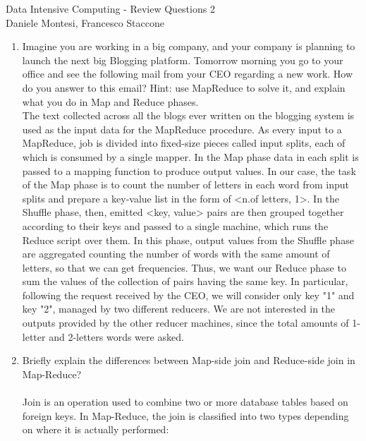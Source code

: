 \documentclass[]{report}
\begin{document}
\begin{center}
 {\Large Data Intensive Computing - Review Questions 2}\\
 \vspace{0.5cm}
 {\small Daniele Montesi, Francesco Staccone}
\end{center}
\vspace{0.5cm}
\justify
\begin{enumerate}
 \item Imagine you are working in a big company, and your company is planning to launch the next big Blogging
platform. Tomorrow morning you go to your office and see the following mail from your CEO regarding
a new work. How do you answer to this email? Hint: use MapReduce to solve it, and explain what you
do in Map and Reduce phases.\\

The text collected across all the blogs ever written on the blogging system is used as the input data for the MapReduce procedure. As every input to a MapReduce, job is divided into fixed-size pieces called input splits, each of which is consumed by a single mapper. In the Map phase data in each split is passed to a mapping function to produce output values. In our case, the task of the Map phase is to count the number of letters in each word from input splits and prepare a key-value list in the form of <n.of letters, 1>. In the Shuffle phase, then, emitted <key, value> pairs are then grouped together according to their keys and passed to a single machine, which runs the Reduce script over them. In this phase, output values from the Shuffle phase are aggregated counting the number of words with the same amount of letters, so that we can get frequencies. Thus, we want our Reduce phase to sum the values of the collection of pairs having the same key. In particular, following the request received by the CEO, we will consider only key "1" and key "2", managed by two different reducers. We are not interested in the outputs provided by the other reducer machines, since the total amounts of 1-letter and 2-letters words were asked.

 \item Briefly explain the differences between Map-side join and Reduce-side join in Map-Reduce?\\\\
 Join is an operation used to combine two or more database tables based on foreign keys. In Map-Reduce, the join is classified into two types depending on where it is actually performed:\\


\end{enumerate}
\end{document}
